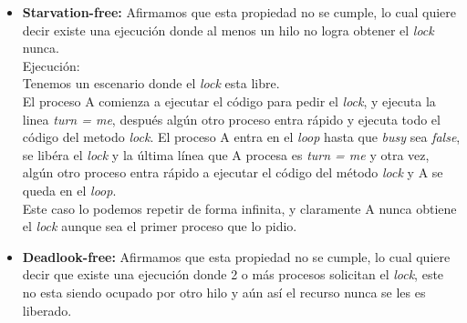 \documentclass{article}
\begin{document}
\begin{enumerate}
{\begin{itemize}
{            Demostración (por contradicción):\\
            Supongamos que 2 o más procesos adquieren el \textit{lock}
            antes de que este se libere.\\

            Si dos o más procesos adquirieron el \textit{lock} eso
            quiere decir que en algún momento ellos procesaron 
            \textit{turn != me} como \textit{false} y por lo tanto
            tuvieron que procesar \textit{while(busy)} como
            \textit{false}.\\
            Pero para que eso pase, cada proceso que obtuvo el
            \textit{lock} ejecuto \textit{turn = me}, por lo que el
            último que lo escribio fue el único que vio \textit{turn
              != me} como \textit{false}, lo cual es una contradicción
            por que todos vieron \textit{turn != me} como
            \textit{false}, por lo tanto la exclusión mutua se cumple.\\
          }

        \item{\textbf{Starvation-free:} Afirmamos que esta propiedad
            no se cumple, lo cual quiere decir existe una ejecución
            donde al menos un hilo no logra obtener el \textit{lock}
            nunca.\\

            Ejecución:\\
            Tenemos un escenario donde el \textit{lock} esta libre.\\
            El proceso A comienza a ejecutar el código para pedir el
            \textit{lock}, y ejecuta la linea \textit{turn =
              me}, después algún otro proceso entra rápido y ejecuta
            todo el código del metodo \textit{lock}. El proceso A
            entra en el \textit{loop} hasta que \textit{busy} sea
            \textit{false}, se libéra el \textit{lock} y la última
            línea que A procesa es \textit{turn = me} y otra vez,
            algún otro proceso entra rápido a ejecutar el código del
            método \textit{lock} y A se queda en el \textit{loop}.\\
            Este caso lo podemos repetir de forma infinita, y
            claramente A nunca obtiene el \textit{lock} aunque sea el
            primer proceso que lo pidio.\\

          }

          \item{\textbf{Deadlook-free:} Afirmamos que esta propiedad
              no se cumple, lo cual quiere decir que existe una
              ejecución donde 2 o más procesos solicitan el
              \textit{lock}, este no esta siendo ocupado por otro hilo
              y aún así el recurso nunca se les es liberado.\\

}
\end{itemize}}
\end{enumerate}
\end{document}
